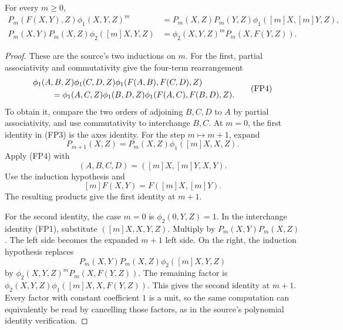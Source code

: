 \begin{srlemma}\label{lem:faithful-Pm-identities}
For every \(m\ge0\),
\[
 \begin{split}
 P_m(F(X,Y),Z)\phi_1(X,Y,Z)^m
       &=P_m(X,Z)P_m(Y,Z)
                                \phi_1([m]X,[m]Y,Z),\\
 P_m(X,Y)P_m(X,Z)\phi_2([m]X,Y,Z)
       &=\phi_2(X,Y,Z)^m P_m(X,F(Y,Z)).
 \end{split}
 \tag{FP3}\label{eq:faithful-Pm-identities}
\]
\end{srlemma}
\begin{proof}
These are the source's two inductions on \(m\).
For the first, partial associativity and commutativity give
the four-term rearrangement
\[
 \begin{split}
 &\phi_1(A,B,Z)\phi_1(C,D,Z)
                              \phi_1(F(A,B),F(C,D),Z)\\
 &\hspace{8mm}=
 \phi_1(A,C,Z)\phi_1(B,D,Z)
                              \phi_1(F(A,C),F(B,D),Z).
 \end{split}
 \tag{FP4}\label{eq:faithful-four-term}
\]
To obtain it, compare the two orders of adjoining \(B,C,D\)
to \(A\) by partial associativity, and use commutativity to
interchange \(B,C\).
At \(m=0\), the first identity in (FP3) is the axes identity.
For the step \(m\mapsto m+1\), expand
\[
          P_{m+1}(X,Z)=P_m(X,Z)\phi_1([m]X,X,Z).
\]
Apply (FP4) with
\[
                  (A,B,C,D)=([m]X,[m]Y,X,Y).
\]
Use the induction hypothesis and
\[
                  [m]F(X,Y)=F([m]X,[m]Y).
\]
The resulting products give the first identity at \(m+1\).

For the second identity, the case \(m=0\) is
\(\phi_2(0,Y,Z)=1\).
In the interchange identity (FP1), substitute
\(([m]X,X,Y,Z)\).
Multiply by \(P_m(X,Y)P_m(X,Z)\).
The left side becomes the expanded \(m+1\) left side.
On the right, the induction hypothesis replaces
\[
 P_m(X,Y)P_m(X,Z)\phi_2([m]X,Y,Z)
\]
by \(\phi_2(X,Y,Z)^mP_m(X,F(Y,Z))\).
The remaining factor is
\(\phi_2(X,Y,Z)\phi_1([m]X,X,F(Y,Z))\).
This gives the second identity at \(m+1\).
Every factor with constant coefficient \(1\) is a unit,
so the same computation can equivalently be read by
cancelling those factors, as in the source's polynomial
identity verification.
\end{proof}

